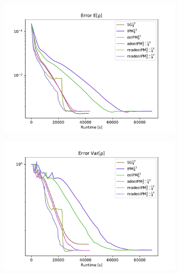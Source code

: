 \begin{figure}[h!]
\centering
	\begin{subfigure}{0.5\linewidth}
		\centering
				\includegraphics[width=\linewidth]{figs/errorEuler/L2_error_E[rho].pdf}
		\caption{}
		\label{fig:sub31}
	\end{subfigure}%
	\begin{subfigure}{0.5\linewidth}
		\centering
				\includegraphics[width=\linewidth]{figs/errorEuler/L2_error_Var[rho].pdf}
		\caption{}
		\label{fig:sub32}
	\end{subfigure}
	

\end{figure}
